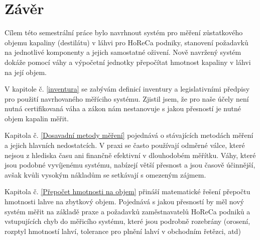 \chapter*{Závěr}
{}

%
%
%



Cílem této semestrální práce bylo navrhnout systém pro měření zůstatkového objemu kapaliny (destilátu) v láhvi pro HoReCa podniky, stanovení požadavků na jednotlivé komponenty a jejich samostatné oživení. Nově navržený systém dokáže pomocí váhy a výpočetní jednotky přepočítat hmotnost kapaliny v láhvi na její objem.

V kapitole č. \ref{inventura} se zabývám definicí inventury a legislativními předpisy pro použití navrhovaného měříciho systému. Zjistil jsem, že pro naše účely není nutná certifikovaná váha a zákon nám nestanovuje s jakou přesností je nutné objem kapalin měřit. 

Kapitola č. \ref{Dosavadní metody měření} pojednává o stávajících metodách měření a jejich hlavních nedostatcích. V praxi se často používají odměrné válce, které nejsou z hlediska času ani finančně efektivní v dlouhodobém měřítku. Váhy, které jsou podobné vyvíjenému systému, nabízejí větší přesnost a jsou časově účinnější, avšak kvůli vysokým nákladům se setkávají s omezeným zájmem.

Kapitola č. \ref{Přepočet hmotnosti na objem} přináší matematické řešení přepočtu hmotnosti lahve na zbytkový objem. Pojednává s jakou přesností by měl nový systém měřit na základě praxe a požadavků zaměstnavatelů HoReCa podniků a vstupujících chyb do měřicího systému, které jsou podrobně rozebrány (orosení, rozptyl hmotností lahví, tolerance pro plnění lahví v obchodním řetězci, atd)


